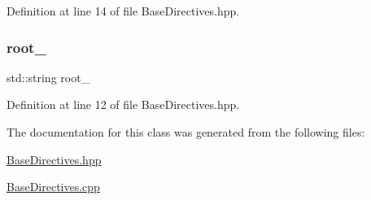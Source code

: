 Definition at line 14 of file Base\+Directives.\+hpp.

\mbox{\label{classft_1_1_base_directives_abb1eaf0bba10b90172d6152e69457dc7}} 
\subsubsection{\texorpdfstring{root\+\_\+}{root\_}}
{\footnotesize\ttfamily std\+::string root\+\_\+\hspace{0.3cm}{\ttfamily [protected]}}



Definition at line 12 of file Base\+Directives.\+hpp.



The documentation for this class was generated from the following files\+:\begin{DoxyCompactItemize}
\item 
\hyperlink{_base_directives_8hpp}{Base\+Directives.\+hpp}\item 
\hyperlink{_base_directives_8cpp}{Base\+Directives.\+cpp}\end{DoxyCompactItemize}
